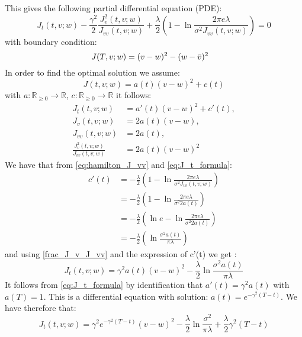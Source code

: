 \documentclass[oneside, a4paper, onecolumn, 11pt]{article}
\begin{document}
This gives the following partial differential equation (PDE):
\begin{equation}
J_t(t,v;w) - \frac{\gamma^2}{2}\frac{J_v^2(t,v;w)}{J_{vv}(t,v;w)} + \frac{\lambda}{2}\left(1-\ln \frac{2\pi e \lambda}{\sigma^2J_{vv}(t,v;w)}\right) = 0 \label{eq:hamilton_J_vv}
\end{equation}
with boundary condition:
\begin{equation}
    J(T,v;w)= (v-w)^2 - (w - \Bar{v})^2 \quad 
\end{equation}
In order to find the optimal solution we assume:
\begin{equation}
    J(t,v;w) = a(t) (v-w)^2 + c(t) \label{eq:assumption_J}
 \end{equation}
with $a:\mathbb{R}_{\geq 0}\to \mathbb{R}$,  $c:\mathbb{R}_{\geq 0}\to \mathbb{R}$ it follows: 
\begin{align}
    J_t(t,v;w) &= a'(t)(v-w)^2  + c'(t), \label{eq:J_t_formula} \\
    J_v(t,v;w) &= 2a(t)(v-w), \\ 
    J_{vv}(t,v;w)&= 2a(t),\\
    \frac{J^2_v(t,v;w)}{J_{vv}(t,v;w)} &= 2a(t)(v-w)^2 \label{frac_J_v_J_vv}
\end{align}
We have that from \eqref{eq:hamilton_J_vv}  and \eqref{eq:J_t_formula}: 
\begin{align*}
    c'(t)&= - \frac{\lambda}{2}\left(1-\ln \frac{2\pi e \lambda}{\sigma^2J_{vv}(t,v;w)}\right) \\
    &= - \frac{\lambda}{2}\left(1-\ln \frac{2\pi e \lambda}{\sigma^2 2a(t)}\right)\\
    &= - \frac{\lambda}{2}\left(\ln{e}-\ln \frac{2\pi e \lambda}{\sigma^2 2a(t)}\right)\\
    &= - \frac{\lambda}{2}\left(\ln \frac{\sigma^2 a(t)}{\pi \lambda}\right)
\end{align*}
and using  \eqref{frac_J_v_J_vv} and the expression of c'(t) we get :
\begin{equation}
    J_t(t,v;w) = \gamma^2 a(t) (v-w)^2 - \frac{\lambda}{2} \ln \frac{\sigma^2 a(t)}{\pi \lambda} \label{eq:boundary:condition}
\end{equation}
It follows from \eqref{eq:J_t_formula} by identification that $a'(t) = \gamma^2 a(t)$ with $a(T)= 1$. This is a differential equation with solution: $a(t) = e^{-\gamma^2(T-t)}$. 
We have therefore that: 
\begin{equation*}
J_t(t,v;w) = \gamma^2 e^{-\gamma^2(T-t)}(v- w)^2 - \frac{\lambda}{2}\ln{\frac{\sigma^2}{\pi \lambda}} + \frac{\lambda}{2}\gamma^2(T-t)
\end{equation*}
\end{document}
